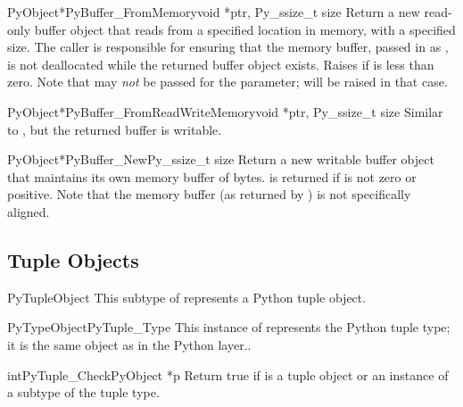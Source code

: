 \begin{cfuncdesc}{PyObject*}{PyBuffer_FromMemory}{void *ptr, Py_ssize_t size}
  Return a new read-only buffer object that reads from a specified
  location in memory, with a specified size.  The caller is
  responsible for ensuring that the memory buffer, passed in as
  , is not deallocated while the returned buffer object
  exists.  Raises  if  is less than
  zero.  Note that  may \emph{not} be
  passed for the  parameter;  will be
  raised in that case.
\end{cfuncdesc}

\begin{cfuncdesc}{PyObject*}{PyBuffer_FromReadWriteMemory}{void *ptr, Py_ssize_t size}
  Similar to , but the returned
  buffer is writable.
\end{cfuncdesc}

\begin{cfuncdesc}{PyObject*}{PyBuffer_New}{Py_ssize_t size}
  Return a new writable buffer object that maintains its own memory
  buffer of  bytes.   is returned if
   is not zero or positive.  Note that the memory buffer (as
  returned by ) is not specifically
  aligned.
\end{cfuncdesc}


\subsection{Tuple Objects \label{tupleObjects}}

\begin{ctypedesc}{PyTupleObject}
  This subtype of  represents a Python tuple object.
\end{ctypedesc}

\begin{cvardesc}{PyTypeObject}{PyTuple_Type}
  This instance of  represents the Python tuple
  type; it is the same object as  in the Python
  layer..
\end{cvardesc}

\begin{cfuncdesc}{int}{PyTuple_Check}{PyObject *p}
  Return true if  is a tuple object or an instance of a subtype
  of the tuple type.
\end{cfuncdesc}

